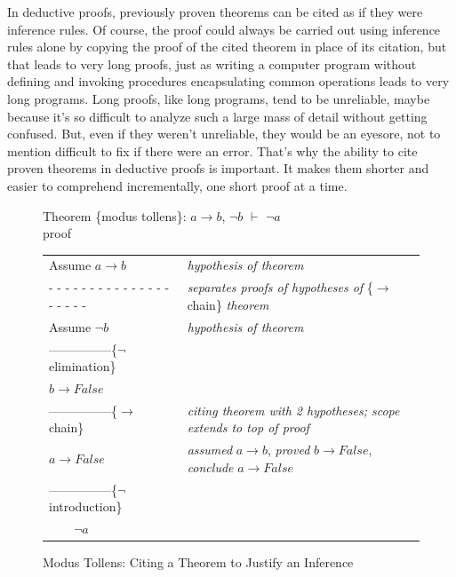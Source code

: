 {In deductive proofs, previously proven theorems
can be cited as if they were inference rules.
Of course, the proof could always be carried out using inference rules alone
by copying the proof of the cited theorem in place of its citation,
but that leads to very long proofs, just as writing a computer program
without defining and invoking procedures encapsulating common operations
leads to very long programs. Long proofs, like long programs, tend
to be unreliable, maybe because it's so difficult
to analyze such a large mass of
detail without getting confused.
But, even if they weren't unreliable, they would be an eyesore,
not to mention difficult to fix if there were an error.
That's why the ability to cite proven theorems in
deductive proofs is important. It makes them shorter
and easier to comprehend incrementally, one short proof at a time.

\begin{figure}
Theorem \{modus tollens\}: $a \rightarrow b$, $\neg b$ $\vdash$ $\neg a$\\
proof
\begin{center}
\begin{tabular}{ll}
Assume $a \rightarrow b$                      &\emph{hypothesis of theorem}\\
 - - - - - - - - - - - - - - - - - - - -      &\emph{separates proofs of hypotheses of} \{$\rightarrow$ chain\} \emph{theorem}\\
Assume $\neg b$                               &\emph{hypothesis of theorem}\\
---------------\{$\neg$ elimination\}         &\\
$b \rightarrow False$                         &\\
---------------\{$\rightarrow$ chain\}        & \emph{citing theorem with 2 hypotheses; scope extends to top of proof}\\
$a \rightarrow False$                         &\emph{assumed} $a \rightarrow b$, \emph{proved} $b \rightarrow False$, \emph{conclude} $a \rightarrow False$\\
---------------\{$\neg$ introduction\}        &\\
~~~~$\neg a$                                  &\\
\end{tabular}
\end{center}
\caption{Modus Tollens: Citing a Theorem to Justify an Inference}
\label{fig:modtol-proof}
\end{figure}

}
